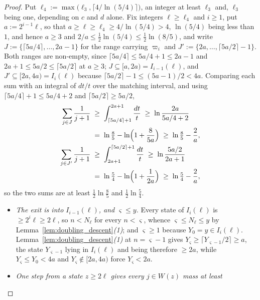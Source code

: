 \begin{proof}
Put $\ell_4:=\max\bigl(\ell_3,\lceil4/\ln(5/4)\rceil\bigr)$, an integer at least $\ell_3$ and,
$\ell_3$ being one, depending on $c$ and $d$ alone. Fix integers $\ell\geq\ell_4$ and $i\geq1$,
put $a:=2^{i-1}\ell$, so that $a\geq\ell\geq\ell_4\geq4/\ln(5/4)>4$, $\ln(5/4)$ being
less than $1$, and hence $a\geq3$ and
$2/a\leq\tfrac12\ln(5/4)\leq\tfrac12\ln(8/5)$, and write
$J:=\{\lceil5a/4\rceil,\dots,2a-1\}$ for the range carrying $\varpi_i$ and
$J':=\{2a,\dots,\lceil5a/2\rceil-1\}$. Both ranges are non-empty, since
$\lceil5a/4\rceil\leq5a/4+1\leq2a-1$ and $2a+1\leq5a/2\leq\lceil5a/2\rceil$ at $a\geq3$;
$J\subseteq[a,2a)=I_{i-1}(\ell)$, and $J'\subseteq[2a,4a)=I_i(\ell)$ because
$\lceil5a/2\rceil-1\leq(5a-1)/2<4a$. Comparing each sum with an integral of $dt/t$ over the
matching interval, and using $\lceil5a/4\rceil+1\leq5a/4+2$ and $\lceil5a/2\rceil\geq5a/2$,
\begin{equation}\label{eq:doubling_windowsums}
\begin{aligned}
    \sum_{j\in J}\frac1{j+1}\;&\geq\;\int_{\lceil5a/4\rceil+1}^{2a+1}\frac{dt}t
    \;\geq\;\ln\frac{2a}{5a/4+2}\\
    \;&=\;\ln\tfrac85-\ln\Bigl(1+\frac8{5a}\Bigr)\;\geq\;\ln\tfrac85-\frac2a,\\
    \sum_{j\in J'}\frac1{j+1}\;&\geq\;\int_{2a+1}^{\lceil5a/2\rceil+1}\frac{dt}t
    \;\geq\;\ln\frac{5a/2}{2a+1}\\
    \;&=\;\ln\tfrac54-\ln\Bigl(1+\frac1{2a}\Bigr)\;\geq\;\ln\tfrac54-\frac2a,
\end{aligned}
\end{equation}
so the two sums are at least $\tfrac12\ln\tfrac85$ and $\tfrac12\ln\tfrac54$.
\begin{itemize}
    \item \emph{The exit is into $I_{i-1}(\ell)$, and $\varsigma\leq y$.} Every state of
    $I_i(\ell)$ is $\geq2^{i}\ell\geq2\ell$, so $n<N_\ell$ for every $n<\varsigma$, whence
    $\varsigma\leq N_\ell\leq y$ by Lemma~\ref{lem:doubling_descent}\emph{(1)}; and
    $\varsigma\geq1$ because $Y_0=y\in I_i(\ell)$. Lemma~\ref{lem:doubling_descent}\emph{(1)}
    at $n=\varsigma-1$ gives $Y_\varsigma\geq\lceil Y_{\varsigma-1}/2\rceil\geq a$, the state
    $Y_{\varsigma-1}$ lying in $I_i(\ell)$ and being therefore $\geq2a$, while
    $Y_\varsigma\leq Y_0<4a$ and $Y_\varsigma\notin[2a,4a)$ force $Y_\varsigma<2a$.
    \item \emph{One step from a state $z\geq2\ell$ gives every $j\in W(z)$ mass at least
}
\end{itemize}
\end{proof}
